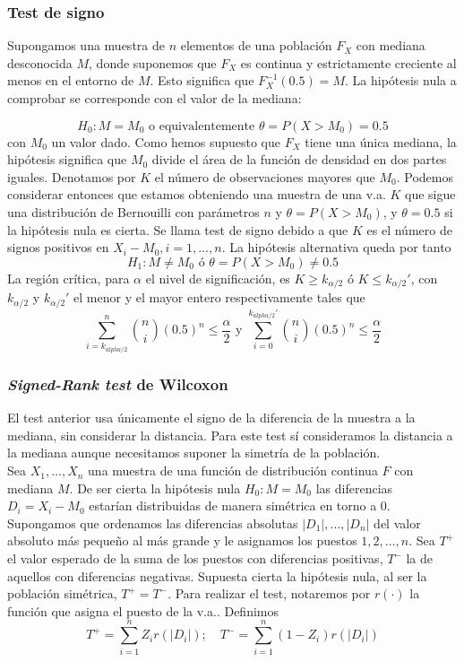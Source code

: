 \subsubsection{Test de signo}

	Supongamos una muestra de $n$ elementos de una población 
$F_X$ con mediana desconocida $M$, donde suponemos que $F_X$ 
es continua y estrictamente creciente al menos en el entorno 
de $M$. Esto significa que $F_X^{-1}(0.5) = M$. La hipótesis 
nula a comprobar se corresponde con el valor de la mediana:

	\[ H_0: M = M_0	\text{ o equivalentemente }
			\theta = P(X > M_0) = 0.5 \]
	con $M_0$ un valor dado. Como hemos supuesto que $F_X$ 
tiene una única mediana, la hipótesis significa que $M_0$ 
divide el área de la función de densidad en dos partes 
iguales. Denotamos por $K$ el número de observaciones mayores 
que $M_0$. Podemos considerar entonces que estamos obteniendo 
una muestra de una v.a. $K$ que sigue una distribución de 
Bernouilli con parámetros $n$ y $\theta=P(X>M_0)$, y 
$\theta=0.5$ si la hipótesis nula es cierta. Se llama test de 
signo debido a que $K$ es el número de signos positivos en 
$X_i - M_0, i = 1, \dots, n$. La hipótesis alternativa queda 
por tanto
	\[ H_1: M \neq M_0	\text{ ó }
			\theta = P(X > M_0) \neq 0.5 \]
	La región crítica, para $\alpha$ el nivel de 
significación, es $K \geq k_{\alpha/2}$ ó $K \leq 
k_{\alpha/2}'$, con $k_{\alpha/2}$ y $k_{\alpha/2}'$ el menor 
y el mayor entero respectivamente tales que
	\[ \sum\limits_{i=k_{alpha/2}}^n
			{n \choose i}(0.5)^n \leq \frac{\alpha}{2}
		\text{ y }
		\sum\limits_{i=0}^{k_{alpha/2}'}
			{n \choose i}(0.5)^n \leq \frac{\alpha}{2}
	\]

\subsubsection{\textit{Signed-Rank test} de Wilcoxon}

	El test anterior usa únicamente el signo de la diferencia 
de la muestra a la mediana, sin considerar la distancia. Para 
este test sí consideramos la distancia a la mediana aunque 
necesitamos suponer la simetría de la población. \\
	Sea $X_1, \dots, X_n$ una muestra de una función de 
distribución continua $F$ con mediana $M$. De ser cierta la 
hipótesis nula $H_0: M = M_0$ las diferencias $D_i = X_i - 
M_0$ estarían distribuidas de manera simétrica en torno 
a 0.\\
	Supongamos que ordenamos las diferencias absolutas 
$|D_1|, \dots, |D_n|$ del valor absoluto más pequeño al más 
grande y le asignamos los puestos $1, 2, \dots, n$. Sea $T^+$ 
el valor esperado de la suma de los puestos con diferencias 
positivas, $T^-$ la de aquellos con diferencias negativas. 
Supuesta cierta la hipótesis nula, al ser la población 
simétrica, $T^+ = T^-$. Para realizar el test, notaremos por
$r(\cdot)$ la función que asigna el puesto de la v.a.. 
Definimos
	\[ T^+ = \sum\limits_{i=1}^n Z_i r(|D_i|); \quad
	   T^- = \sum\limits_{i=1}^n (1-Z_i) r(|D_i|) \]
	   
